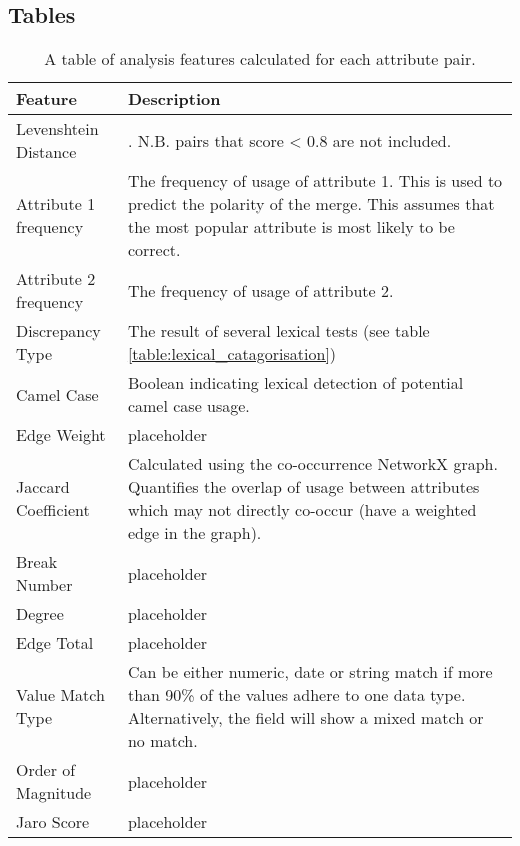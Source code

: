 \documentclass{bmcart}
\begin{document}
\begin{backmatter}
\section*{Tables}
\begin{table}[h!]
\caption{A table of analysis features calculated for each attribute pair.}
      \begin{tabular}{|p{3cm}|p{10cm}|}
        \hline
           Feature & Description  \\ \hline
           Levenshtein Distance &  \cite{levenshtein1966binary}. N.B. pairs that score < 0.8 are not included. \\
           Attribute 1 frequency & The frequency of usage of attribute 1. This is used to predict the polarity of the merge. This assumes that the most popular attribute is most likely to be correct. \\
           Attribute 2 frequency & The frequency of usage of attribute 2.  \\
           Discrepancy Type & The result of several lexical tests (see table \ref{table:lexical_catagorisation}) \\
           Camel Case & Boolean indicating lexical detection of potential camel case usage. \\
           Edge Weight & placeholder \\
           Jaccard Coefficient \cite{jaccard1901distribution} & Calculated using the co-occurrence NetworkX graph. Quantifies the overlap of usage between attributes which may not directly co-occur (have a weighted edge in the graph). \\
           Break Number & placeholder \\
           Degree & placeholder \\
           Edge Total & placeholder \\
           Value Match Type & Can be either numeric, date or string match if more than 90\% of the values adhere to one data type. Alternatively, the field will show a mixed match or no match. \\
           Order of Magnitude & placeholder \\
           Jaro Score & placeholder \\ \hline
      \end{tabular}
\label{table:features}
\end{table}


\end{backmatter}
\end{document}
